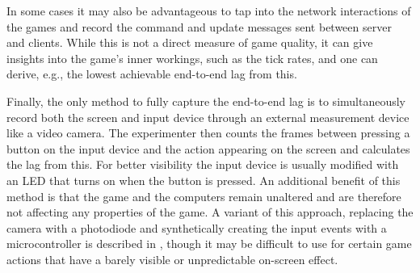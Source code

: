 In some cases it may also be advantageous to tap into the network interactions of the games and record the command and update messages sent between server and clients. While this is not a direct measure of game quality, it can give insights into the game's inner workings, such as the tick rates, and one can derive, e.g., the lowest achievable end-to-end lag from this.




Finally, the only method to fully capture the end-to-end lag is to simultaneously record both the screen and input device through an external measurement device like a video camera.
The experimenter then counts the frames between pressing a button on the input device and the action appearing on the screen and calculates the lag from this. For better visibility the input device is usually modified with an LED that turns on when the button is pressed. 
An additional benefit of this method is that the game and the computers remain unaltered and are therefore not affecting any properties of the game. A variant of this approach, replacing the camera with a photodiode and synthetically creating the input events with a microcontroller is described in \cite{beyermethod}, though it may be difficult to use for certain game actions that have a barely visible or unpredictable on-screen effect.




